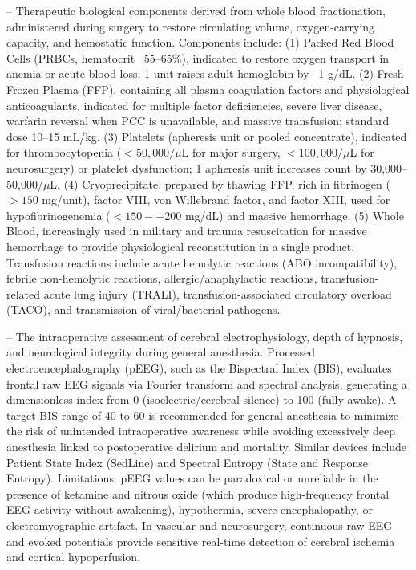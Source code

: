 -- Therapeutic biological components derived from whole blood fractionation, administered during surgery to restore circulating volume, oxygen-carrying capacity, and hemostatic function. Components include: (1) Packed Red Blood Cells (PRBCs, hematocrit ~55--65\%), indicated to restore oxygen transport in anemia or acute blood loss; 1 unit raises adult hemoglobin by ~1 g/dL. (2) Fresh Frozen Plasma (FFP), containing all plasma coagulation factors and physiological anticoagulants, indicated for multiple factor deficiencies, severe liver disease, warfarin reversal when PCC is unavailable, and massive transfusion; standard dose 10--15 mL/kg. (3) Platelets (apheresis unit or pooled concentrate), indicated for thrombocytopenia ($<50,000/\mu$L for major surgery, $<100,000/\mu$L for neurosurgery) or platelet dysfunction; 1 apheresis unit increases count by 30,000--50,000/$\mu$L. (4) Cryoprecipitate, prepared by thawing FFP, rich in fibrinogen ($>150$ mg/unit), factor VIII, von Willebrand factor, and factor XIII, used for hypofibrinogenemia ($<150--200$ mg/dL) and massive hemorrhage. (5) Whole Blood, increasingly used in military and trauma resuscitation for massive hemorrhage to provide physiological reconstitution in a single product. Transfusion reactions include acute hemolytic reactions (ABO incompatibility), febrile non-hemolytic reactions, allergic/anaphylactic reactions, transfusion-related acute lung injury (TRALI), transfusion-associated circulatory overload (TACO), and transmission of viral/bacterial pathogens.

-- The intraoperative assessment of cerebral electrophysiology, depth of hypnosis, and neurological integrity during general anesthesia. Processed electroencephalography (pEEG), such as the Bispectral Index (BIS), evaluates frontal raw EEG signals via Fourier transform and spectral analysis, generating a dimensionless index from 0 (isoelectric/cerebral silence) to 100 (fully awake). A target BIS range of 40 to 60 is recommended for general anesthesia to minimize the risk of unintended intraoperative awareness while avoiding excessively deep anesthesia linked to postoperative delirium and mortality. Similar devices include Patient State Index (SedLine) and Spectral Entropy (State and Response Entropy). Limitations: pEEG values can be paradoxical or unreliable in the presence of ketamine and nitrous oxide (which produce high-frequency frontal EEG activity without awakening), hypothermia, severe encephalopathy, or electromyographic artifact. In vascular and neurosurgery, continuous raw EEG and evoked potentials provide sensitive real-time detection of cerebral ischemia and cortical hypoperfusion.

